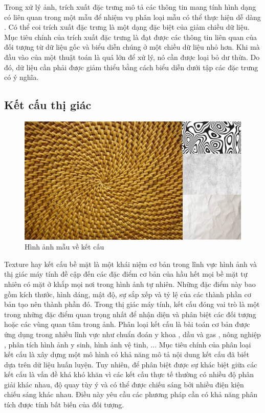 Trong xử lý ảnh, trích xuất đặc trưng mô tả các thông tin mang tính hình dạng có liên quan trong một mẫu để nhiệm vụ phân loại mẫu có thể thực hiện dễ dàng \cite{featureImgprocessing}. Có thể coi trích xuất đặc trưng là một dạng đặc biệt của giảm chiều dữ liệu. Mục tiêu chính của trích xuất đặc trưng là đạt được các thông tin liên quan của đối tượng từ dữ liệu gốc và biểu diễn chúng ở một chiều dữ liệu nhỏ hơn. Khi mà đầu vào của một thuật toán là quá lớn để xử lý, nó cần được loại bỏ dư thừa. Do đó, dữ liệu cần phải được giảm thiểu bằng cách biểu diễn dưới tập các đặc trưng có ý nghĩa. 
\subsection{Kết cấu thị giác}

\begin{figure} [h]
	\centering
	\includegraphics[width=0.8\linewidth]{figures/image1.png}
	\caption{Hình ảnh mẫu về kết cấu}
	\label{fig:image1}
\end{figure}
Texture hay kết cấu bề mặt là một khái niệm cơ bản trong lĩnh vực hình ảnh và thị giác máy tính đề cập đến các đặc điểm cơ bản của hầu hết mọi bề mặt tự nhiên có mặt ở khắp mọi nơi trong hình ảnh tự nhiên. Những đặc điểm này bao gồm kích thước, hình dáng, mật độ, sự sắp xếp và tỷ lệ của các thành phần cơ bản tạo nên thành phần đó. Trong thị giác máy tính, kết cấu đóng vai trò là một trong những đặc điểm quan trọng nhất để nhận diện và phân biệt các đối tượng hoặc các vùng quan tâm trong ảnh. Phân loại kết cấu là bài toán cơ bản được ứng dụng trong nhiều lĩnh vực như chuẩn đoán y khoa \cite{medicalImage}, dầu và gas \cite{textureBasedTechniques}, nông nghiệp \cite{smartFarming}, phân tích hình ảnh y sinh, hình ảnh vệ tinh, ... Mục tiêu chính của phân loại kết cấu là xây dựng một mô hình có khả năng mô tả nội dung kết cấu đã biết dựa trên dữ liệu huấn luyện. Tuy nhiên, để phân biệt được sự khác biệt giữa các kết cấu là vấn đề khá khó khăn vì các kết cấu thực tế thường có nhiều độ phân giải khác nhau, độ quay tùy ý và có thể được chiếu sáng bởi nhiều điện kiện chiếu sáng khác nhau. Điều này yêu cầu các phương pháp cần có khả năng phân tích được tính bất biến của đối tượng.


